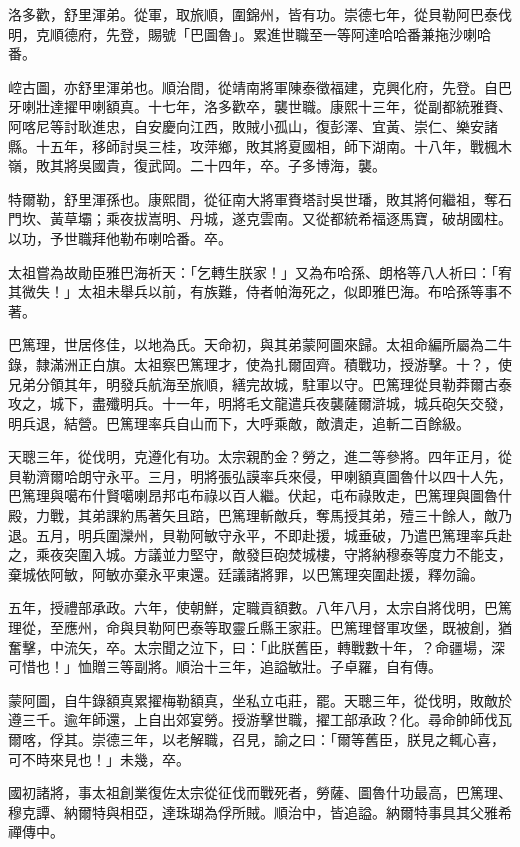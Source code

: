 \begin{pinyinscope}
洛多歡，舒里渾弟。從軍，取旅順，圍錦州，皆有功。崇德七年，從貝勒阿巴泰伐明，克順德府，先登，賜號「巴圖魯」。累進世職至一等阿達哈哈番兼拖沙喇哈番。

崆古圖，亦舒里渾弟也。順治間，從靖南將軍陳泰徵福建，克興化府，先登。自巴牙喇壯達擢甲喇額真。十七年，洛多歡卒，襲世職。康熙十三年，從副都統雅賚、阿喀尼等討耿進忠，自安慶向江西，敗賊小孤山，復彭澤、宜黃、崇仁、樂安諸縣。十五年，移師討吳三桂，攻萍鄉，敗其將夏國相，師下湖南。十八年，戰楓木嶺，敗其將吳國貴，復武岡。二十四年，卒。子多博海，襲。

特爾勒，舒里渾孫也。康熙間，從征南大將軍賚塔討吳世璠，敗其將何繼祖，奪石門坎、黃草壩；乘夜拔嵩明、丹城，遂克雲南。又從都統希福逐馬寶，破胡國柱。以功，予世職拜他勒布喇哈番。卒。

太祖嘗為故勛臣雅巴海祈天：「乞轉生朕家！」又為布哈孫、朗格等八人祈曰：「宥其微失！」太祖未舉兵以前，有族難，侍者帕海死之，似即雅巴海。布哈孫等事不著。

巴篤理，世居佟佳，以地為氏。天命初，與其弟蒙阿圖來歸。太祖命編所屬為二牛錄，隸滿洲正白旗。太祖察巴篤理才，使為扎爾固齊。積戰功，授游擊。十？，使兄弟分領其年，明發兵航海至旅順，繕完故城，駐軍以守。巴篤理從貝勒莽爾古泰攻之，城下，盡殲明兵。十一年，明將毛文龍遣兵夜襲薩爾滸城，城兵砲矢交發，明兵退，結營。巴篤理率兵自山而下，大呼乘敵，敵潰走，追斬二百餘級。

天聰三年，從伐明，克遵化有功。太宗親酌金？勞之，進二等參將。四年正月，從貝勒濟爾哈朗守永平。三月，明將張弘謨率兵來侵，甲喇額真圖魯什以四十人先，巴篤理與噶布什賢噶喇昂邦屯布祿以百人繼。伏起，屯布祿敗走，巴篤理與圖魯什殿，力戰，其弟課約馬著矢且踣，巴篤理斬敵兵，奪馬授其弟，殪三十餘人，敵乃退。五月，明兵圍灤州，貝勒阿敏守永平，不即赴援，城垂破，乃遣巴篤理率兵赴之，乘夜突圍入城。方議並力堅守，敵發巨砲焚城樓，守將納穆泰等度力不能支，棄城依阿敏，阿敏亦棄永平東還。廷議諸將罪，以巴篤理突圍赴援，釋勿論。

五年，授禮部承政。六年，使朝鮮，定職貢額數。八年八月，太宗自將伐明，巴篤理從，至應州，命與貝勒阿巴泰等取靈丘縣王家莊。巴篤理督軍攻堡，既被創，猶奮擊，中流矢，卒。太宗聞之泣下，曰：「此朕舊臣，轉戰數十年，？命疆場，深可惜也！」恤贈三等副將。順治十三年，追謚敏壯。子卓羅，自有傳。

蒙阿圖，自牛錄額真累擢梅勒額真，坐私立屯莊，罷。天聰三年，從伐明，敗敵於遵三千。逾年師還，上自出郊宴勞。授游擊世職，擢工部承政？化。尋命帥師伐瓦爾喀，俘其。崇德三年，以老解職，召見，諭之曰：「爾等舊臣，朕見之輒心喜，可不時來見也！」未幾，卒。

國初諸將，事太祖創業復佐太宗從征伐而戰死者，勞薩、圖魯什功最高，巴篤理、穆克譚、納爾特與相亞，達珠瑚為俘所賊。順治中，皆追謚。納爾特事具其父雅希禪傳中。


\end{pinyinscope}
